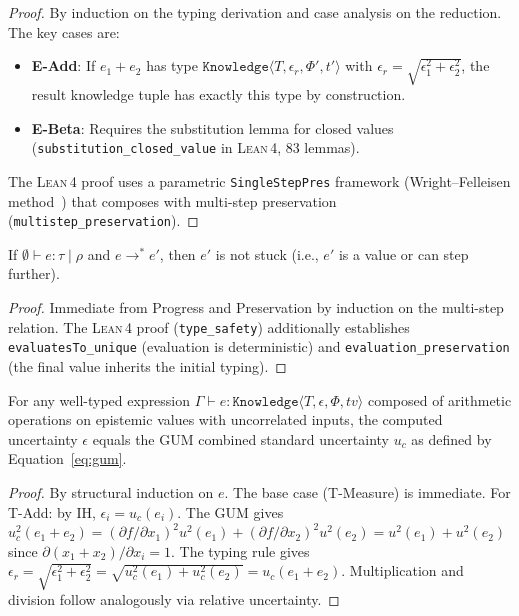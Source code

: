 \documentclass[acmsmall,screen,review,anonymous]{acmart}
\newcommand{\knowfull}[4]{\texttt{Knowledge}\langle #1, #2, #3, #4 \rangle}
\newcommand{\eps}{\epsilon}
\newcommand{\lean}{\textsc{Lean\,4}\xspace}
\begin{document}
\begin{proof}
By induction on the typing derivation and case analysis on the reduction.
The key cases are:
\begin{itemize}
  \item \textbf{E-Add}: If $e_1 + e_2$ has type
        $\knowfull{T}{\eps_r}{\Phi'}{t'}$ with
        $\eps_r = \sqrt{\eps_1^2 + \eps_2^2}$, the result knowledge
        tuple has exactly this type by construction.
  \item \textbf{E-Beta}: Requires the substitution lemma for closed
        values (\texttt{substitution\_closed\_value} in \lean, 83 lemmas).
\end{itemize}
The \lean proof uses a parametric \texttt{SingleStepPres} framework
(Wright--Felleisen method~\cite{wright1994type}) that composes with
multi-step preservation (\texttt{multistep\_preservation}).
\end{proof}

\begin{theorem}
\label{thm:safety}
If $\emptyset \vdash e : \tau \mid \rho$ and $e \longrightarrow^* e'$,
then $e'$ is not stuck (i.e., $e'$ is a value or can step further).
\end{theorem}

\begin{proof}
Immediate from Progress and Preservation by induction on the
multi-step relation.
The \lean proof (\texttt{type\_safety}) additionally establishes
\texttt{evaluatesTo\_unique} (evaluation is deterministic) and
\texttt{evaluation\_preservation} (the final value inherits the
initial typing).
\end{proof}

\begin{theorem}
\label{thm:gum}
For any well-typed expression
$\Gamma \vdash e : \knowfull{T}{\eps}{\Phi}{\mathit{tv}}$
composed of arithmetic operations on epistemic values with uncorrelated
inputs, the computed uncertainty $\eps$ equals the GUM combined standard
uncertainty $u_c$ as defined by Equation~\eqref{eq:gum}.
\end{theorem}

\begin{proof}
By structural induction on $e$.
The base case (T-Measure) is immediate.
For T-Add: by IH, $\eps_i = u_c(e_i)$.
The GUM gives $u_c^2(e_1{+}e_2) = (\partial f/\partial x_1)^2 u^2(e_1)
+ (\partial f/\partial x_2)^2 u^2(e_2) = u^2(e_1) + u^2(e_2)$
since $\partial(x_1{+}x_2)/\partial x_i = 1$.
The typing rule gives $\eps_r = \sqrt{\eps_1^2 + \eps_2^2}
= \sqrt{u_c^2(e_1) + u_c^2(e_2)} = u_c(e_1{+}e_2)$.
Multiplication and division follow analogously via relative uncertainty.
\end{proof}
\end{document}
